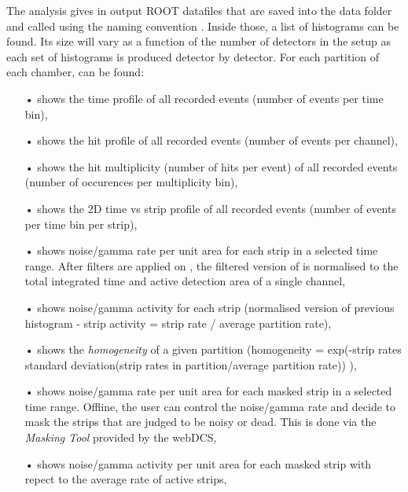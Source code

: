 	The analysis gives in output ROOT datafiles that are saved into the data folder and called using the naming convention . Inside those, a list of  histograms can be found. Its size will vary as a function of the number of detectors in the setup as each set of histograms is produced detector by detector. For each partition of each chamber, can be found:

	\begin{itemize}
		\item[•]  shows the time profile of all recorded events (number of events per time bin),
		\item[•]  shows the hit profile of all recorded events (number of events per channel),
		\item[•]  shows the hit multiplicity (number of hits per event) of all recorded events (number of occurences per multiplicity bin),
		\item[•]  shows the 2D time vs strip profile of all recorded events (number of events per time bin per strip),
		\item[•]  shows noise/gamma rate per unit area for each strip in a selected time range. After filters are applied on , the filtered version of  is normalised to the total integrated time and active detection area of a single channel,
		\item[•]  shows noise/gamma activity for each strip (normalised version of previous histogram - strip activity = strip rate / average partition rate),
		\item[•]  shows the \textit{homogeneity} of a given partition (homogeneity = exp(-strip rates standard deviation(strip rates in partition/average partition rate)) ),
		\item[•]  shows noise/gamma rate per unit area for each masked strip in a selected time range. Offline, the user can control the noise/gamma rate and decide to mask the strips that are judged to be noisy or dead. This is done via the \textit{Masking Tool} provided by the webDCS,
		\item[•]  shows noise/gamma activity per unit area for each masked strip with repect to the average rate of active strips,

\end{itemize}
